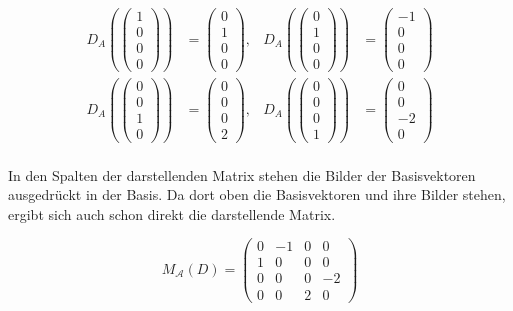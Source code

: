 \documentclass[a4paper,german,12pt,smallheadings]{scrartcl}
\begin{document}
\begin{align*}
  D_A\left(\begin{pmatrix} 1 \\ 0 \\ 0 \\ 0\end{pmatrix}\right) &= \begin{pmatrix} 0 \\ 1 \\ 0 \\ 0\end{pmatrix}, &
  D_A\left(\begin{pmatrix} 0 \\ 1 \\ 0 \\ 0\end{pmatrix}\right) &= \begin{pmatrix} -1 \\ 0 \\ 0 \\ 0\end{pmatrix} \\
  D_A\left(\begin{pmatrix} 0 \\ 0 \\ 1 \\ 0\end{pmatrix}\right) &= \begin{pmatrix} 0 \\ 0 \\ 0 \\ 2\end{pmatrix}, &
  D_A\left(\begin{pmatrix} 0 \\ 0 \\ 0 \\ 1\end{pmatrix}\right) &= \begin{pmatrix} 0 \\ 0 \\ -2 \\ 0\end{pmatrix} \\
\end{align*}

In den Spalten der darstellenden Matrix stehen die Bilder der Basisvektoren
ausgedrückt in der Basis. Da dort oben die Basisvektoren und ihre Bilder
stehen, ergibt sich auch schon direkt die darstellende Matrix.

\begin{equation}
  M_{\mathcal{A}}(D) = \begin{pmatrix}0 & -1 & 0 & 0 \\ 1 & 0 & 0 & 0 \\ 0 & 0 & 0 & -2 \\ 0 & 0 & 2 & 0\end{pmatrix}
\end{equation}
\end{document}
